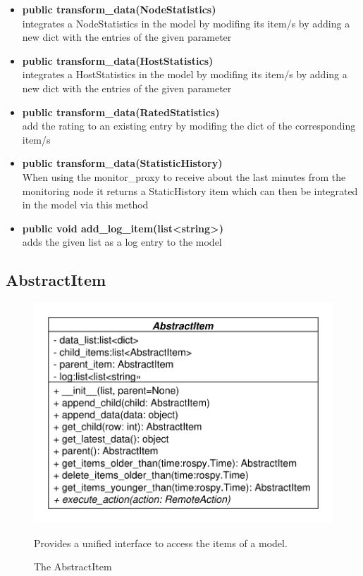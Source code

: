 \begin{itemize}
  \item \textbf{public transform\_data(NodeStatistics)}\\ 
  integrates a NodeStatistics in the model by modifing its item/s by adding a new dict with the entries of the given parameter
  \item \textbf{public transform\_data(HostStatistics)}\\ 
  integrates a HostStatistics in the model by modifing its item/s by adding a new dict with the entries of the given parameter
  \item \textbf{public transform\_data(RatedStatistics)}\\ 
  add the rating to an existing entry by modifing the dict of the corresponding
  item/s
  \item \textbf{public transform\_data(StatisticHistory)}\\ 
  When using the monitor\_proxy to receive about the last minutes from the monitoring node
  it returns a StaticHistory item which can then be integrated in the model via this method
  \item\textbf{public void add\_log\_item(list<string>)}\\
  adds the given list as a log entry to the model
  \end{itemize}

\subsection{AbstractItem}
\begin{figure}[htbp]
	\begin{minipage}[t]{7cm}
		\vspace{0pt}
		\centering
		\includegraphics[scale=0.6]{./diagram_pictures/AbstractItem.pdf}
		\caption{The AbstractItem}
	\end{minipage}
	\hfill
	\begin{minipage}[t]{6cm}
		\vspace{10pt}		
		Provides a unified interface to access the items of a model.
	\end{minipage}
\end{figure}
